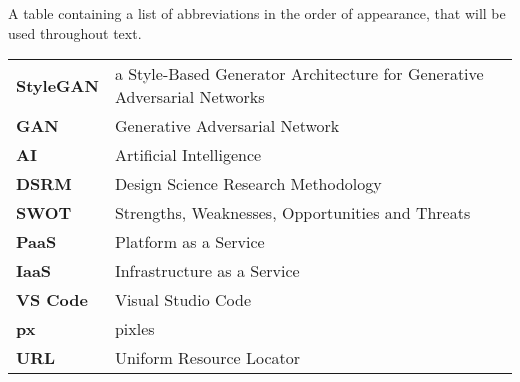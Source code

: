 \documentclass[a4paper,oneside,12pt]{book}
\begin{document}
\begin{TableOfAbbrev}
			A table containing a list of abbreviations in the order of appearance, that will be used throughout text.
			\begin{table}[!htpb!]%
			\begin{tabular}{ll}
			\textbf{StyleGAN} & a Style-Based Generator Architecture for Generative Adversarial Networks\\
			\textbf{GAN} & Generative Adversarial Network\\
			\textbf{AI} & Artificial Intelligence\\
			\textbf{DSRM} & Design Science Research Methodology\\
			\textbf{SWOT} & Strengths, Weaknesses, Opportunities and Threats\\
			\textbf{PaaS} & Platform as a Service\\
			\textbf{IaaS} & Infrastructure as a Service\\
			\textbf{VS Code} & Visual Studio Code\\
			\textbf{px} & pixles\\
			\textbf{URL} & Uniform Resource Locator\\
			\end{tabular}
			\end{table}
\end{TableOfAbbrev}

\pagestyle{fancy}
\setcounter{page}{1}
\fancyhead{}
\renewcommand{\headrulewidth}{0pt}
\fancyfoot[c]{\thepage}









\appendix			




\end{document}
